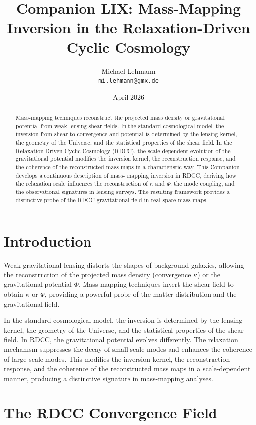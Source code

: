 \documentclass[11pt,a4paper]{article}
\title{\textbf{Companion LIX: Mass-Mapping Inversion in the Relaxation-Driven Cyclic Cosmology}}
\author{Michael Lehmann \\ \texttt{mi.lehmann@gmx.de}}
\date{April 2026}
\begin{document}
\maketitle

\begin{abstract}
Mass-mapping techniques reconstruct the projected mass density or gravitational 
potential from weak-lensing shear fields. In the standard cosmological model, the 
inversion from shear to convergence and potential is determined by the lensing 
kernel, the geometry of the Universe, and the statistical properties of the shear 
field. In the Relaxation-Driven Cyclic Cosmology (RDCC), the scale-dependent 
evolution of the gravitational potential modifies the inversion kernel, the 
reconstruction response, and the coherence of the reconstructed mass maps in a 
characteristic way. This Companion develops a continuous description of mass-
mapping inversion in RDCC, deriving how the relaxation scale influences the 
reconstruction of $\kappa$ and $\Phi$, the mode coupling, and the observational 
signatures in lensing surveys. The resulting framework provides a distinctive probe 
of the RDCC gravitational field in real-space mass maps.
\end{abstract}
\section{Introduction}

Weak gravitational lensing distorts the shapes of background galaxies, allowing the 
reconstruction of the projected mass density (convergence $\kappa$) or the 
gravitational potential $\Phi$. Mass-mapping techniques invert the shear field to 
obtain $\kappa$ or $\Phi$, providing a powerful probe of the matter distribution 
and the gravitational field.

In the standard cosmological model, the inversion is determined by the lensing 
kernel, the geometry of the Universe, and the statistical properties of the shear 
field. In RDCC, the gravitational potential evolves differently. The relaxation 
mechanism suppresses the decay of small-scale modes and enhances the coherence of 
large-scale modes. This modifies the inversion kernel, the reconstruction response, 
and the coherence of the reconstructed mass maps in a scale-dependent manner, 
producing a distinctive signature in mass-mapping analyses.
\section{The RDCC Convergence Field}
\end{document}
